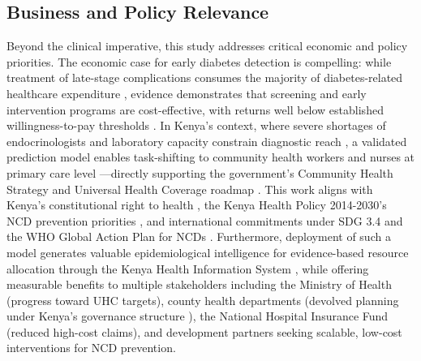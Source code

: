 \documentclass[12pt]{article}
\begin{document}
\subsection{Business and Policy Relevance}
Beyond the clinical imperative, this study addresses critical economic and policy priorities. The economic case for early diabetes detection is compelling: while treatment of late-stage complications consumes the majority of diabetes-related healthcare expenditure \citep{ADA2018Economics}, evidence demonstrates that screening and early intervention programs are cost-effective, with returns well below established willingness-to-pay thresholds \citep{zhuo2014}. In Kenya's context, where severe shortages of endocrinologists and laboratory capacity constrain diagnostic reach \citep{MOH2018Workforce}, a validated prediction model enables task-shifting to community health workers and nurses at primary care level \citep{Ogedegbe2014}—directly supporting the government's Community Health Strategy \citep{MOH2014CHS} and Universal Health Coverage roadmap \citep{MOH2018UHC}. This work aligns with Kenya's constitutional right to health \citep{KenyaConstitution2010}, the Kenya Health Policy 2014-2030's NCD prevention priorities \citep{MOH2014Policy}, and international commitments under SDG 3.4 and the WHO Global Action Plan for NCDs \citep{UN2015SDG, WHO2013ActionPlan}. Furthermore, deployment of such a model generates valuable epidemiological intelligence for evidence-based resource allocation through the Kenya Health Information System \citep{Manya2014}, while offering measurable benefits to multiple stakeholders including the Ministry of Health (progress toward UHC targets), county health departments (devolved planning under Kenya's governance structure \citep{Barasa2017}), the National Hospital Insurance Fund (reduced high-cost claims), and development partners seeking scalable, low-cost interventions for NCD prevention.
\end{document}
